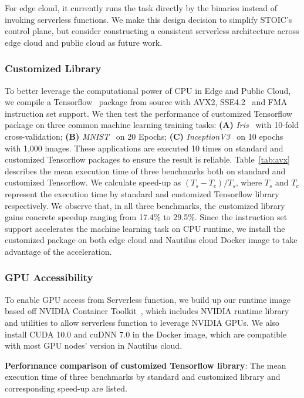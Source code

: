  For edge cloud, it currently runs the task directly by the binaries instead of invoking serverless functions. We make this design decision to simplify STOIC's control plane, but consider constructing a consistent serverless architecture across edge cloud and public cloud as future work.
 
 \BlankLine
 \subsubsection{Customized Library}
 To better leverage the computational power of CPU in Edge and Public Cloud, we compile a Tensorflow~\cite{ref:tensorflow} package from source with AVX2, SSE4.2~\cite{ref:avx} and FMA~\cite{ref:fma} instruction set support. We then test the performance of customized Tensorflow package on three common machine learning training tasks: \textbf{(A)} \textit{Iris}~\cite{ref:iris} with 10-fold cross-validation; \textbf{(B)} \textit{MNIST}~\cite{ref:mnist} on 20 Epochs; \textbf{(C)} \textit{InceptionV3}~\cite{ref:v3} on 10 epochs with 1,000 images. These applications are executed 10 times on standard and customized Tensorflow packages to ensure the result is reliable. Table~\ref{tab:avx} describes the mean execution time of three benchmarks both on standard and customized Tensorflow. We calculate speed-up as $(T_s - T_c) / T_s$, where $T_s$ and $T_c$ represent the execution time by standard and customized Tensorflow library respectively. We observe that, in all three benchmarks, the customized library gains concrete speedup ranging from 17.4\% to 29.5\%. Since the instruction set support accelerates the machine learning task on CPU runtime, we install the customized package on both edge cloud and Nautilus cloud Docker image to take advantage of the acceleration.
 
 \BlankLine
 \subsubsection{GPU Accessibility}
 To enable GPU access from Serverless function, we build up our runtime image based off NVIDIA Container Toolkit~\cite{ref:nvidia}, which includes NVIDIA runtime library and utilities to allow serverless function to leverage NVIDIA GPUs. We also install CUDA 10.0 and cuDNN 7.0 in the Docker image, which are compatible with most GPU nodes' version in Nautilus cloud. 
 
\begin{table}[]
\centering

\caption{\textbf{Performance comparison of customized Tensorflow library}: The mean execution time of three benchmarks by standard and customized library and corresponding speed-up are listed.  }
\label{tab:avx}
\end{table}
 
